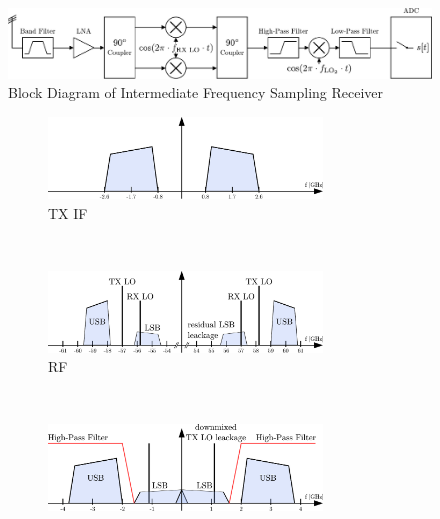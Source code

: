\begin{figure}[h!]
  \centering
  \includegraphics[width=\textwidth]{figures/rx_1_bd}
  \caption{Block Diagram of Intermediate Frequency Sampling Receiver}
  \label{fig:rx_1_bd}
\end{figure}

\begin{figure}[h!]
  \centering
  \begin{subfigure}{\textwidth}
    \centering
    \includegraphics[width=0.8\textwidth]{figures/rx_1_freq_tx_if}
    \caption{\gls{TX} \gls{IF}}
    \label{fig:rx_1_frq_tx_if}
  \end{subfigure}
  \vspace{4ex} \\
  \begin{subfigure}{\textwidth}
    \centering
    \includegraphics[width=0.8\textwidth]{figures/rx_1_freq_rf}
    \caption{\gls{RF}}
    \label{fig:rx_1_freq_rf}
  \end{subfigure}
  \vspace{4ex} \\
  \begin{subfigure}{\textwidth}
    \centering
    \includegraphics[width=0.8\textwidth]{figures/rx_1_freq_rx_if1}

\end{subfigure}
\end{figure}

